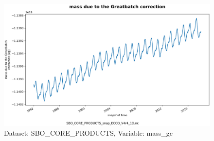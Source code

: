 \begin{figure}[H]
\centering
\includegraphics[scale=0.55]{../images/plots/oneD_plots/SBO_Core_Products/mass_gc.png}
\caption{Dataset: SBO\_CORE\_PRODUCTS, Variable: mass\_gc}
\label{tab:table-SBO_CORE_PRODUCTS_mass_gc-Plot}
\end{figure}
\newpage
\pagebreak
